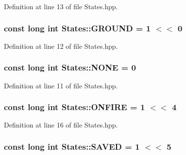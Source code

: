 Definition at line 13 of file States.\+hpp.

\hypertarget{class_states_a0f5e3ed66f9c135b24d92886a9574dca}{
\subsubsection[{G\+R\+O\+U\+N\+D}]{\setlength{\rightskip}{0pt plus 5cm}const long int States\+::\+G\+R\+O\+U\+N\+D = 1 $<$$<$ 0\hspace{0.3cm}{\ttfamily [static]}}}\label{class_states_a0f5e3ed66f9c135b24d92886a9574dca}


Definition at line 12 of file States.\+hpp.

\hypertarget{class_states_a9db2f5d19daaafea1b0b22c8327d1c10}{
\subsubsection[{N\+O\+N\+E}]{\setlength{\rightskip}{0pt plus 5cm}const long int States\+::\+N\+O\+N\+E = 0\hspace{0.3cm}{\ttfamily [static]}}}\label{class_states_a9db2f5d19daaafea1b0b22c8327d1c10}


Definition at line 11 of file States.\+hpp.

\hypertarget{class_states_acd4789eee44fccfaf6ddf2b3d412fb9a}{
\subsubsection[{O\+N\+F\+I\+R\+E}]{\setlength{\rightskip}{0pt plus 5cm}const long int States\+::\+O\+N\+F\+I\+R\+E = 1 $<$$<$ 4\hspace{0.3cm}{\ttfamily [static]}}}\label{class_states_acd4789eee44fccfaf6ddf2b3d412fb9a}


Definition at line 16 of file States.\+hpp.

\hypertarget{class_states_a7ce5eefd815ba486ed485ca3015d9452}{
\subsubsection[{S\+A\+V\+E\+D}]{\setlength{\rightskip}{0pt plus 5cm}const long int States\+::\+S\+A\+V\+E\+D = 1 $<$$<$ 5\hspace{0.3cm}{\ttfamily [static]}}}\label{class_states_a7ce5eefd815ba486ed485ca3015d9452}


